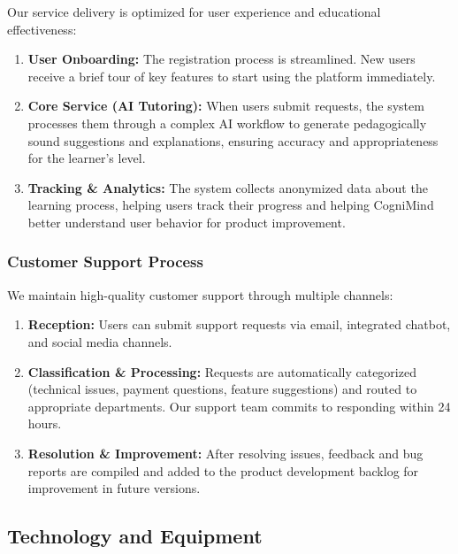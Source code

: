Our service delivery is optimized for user experience and educational effectiveness:

\begin{enumerate}
    \item \textbf{User Onboarding:} The registration process is streamlined. New users receive a brief tour of key features to start using the platform immediately.
    
    \item \textbf{Core Service (AI Tutoring):} When users submit requests, the system processes them through a complex AI workflow to generate pedagogically sound suggestions and explanations, ensuring accuracy and appropriateness for the learner's level.
    
    \item \textbf{Tracking \& Analytics:} The system collects anonymized data about the learning process, helping users track their progress and helping CogniMind better understand user behavior for product improvement.
\end{enumerate}

\subsubsection{Customer Support Process}

We maintain high-quality customer support through multiple channels:

\begin{enumerate}
    \item \textbf{Reception:} Users can submit support requests via email, integrated chatbot, and social media channels.
    
    \item \textbf{Classification \& Processing:} Requests are automatically categorized (technical issues, payment questions, feature suggestions) and routed to appropriate departments. Our support team commits to responding within 24 hours.
    
    \item \textbf{Resolution \& Improvement:} After resolving issues, feedback and bug reports are compiled and added to the product development backlog for improvement in future versions.
\end{enumerate}

\subsection{Technology and Equipment}

